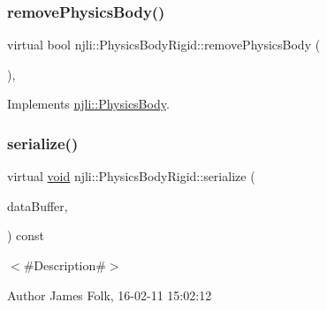 \mbox{\label{classnjli_1_1_physics_body_rigid_a7efbdfc46e8df26d073b00efaaf0c91c}} 
\subsubsection{\texorpdfstring{remove\+Physics\+Body()}{removePhysicsBody()}}
{\footnotesize\ttfamily virtual bool njli\+::\+Physics\+Body\+Rigid\+::remove\+Physics\+Body (\begin{DoxyParamCaption}{ }\end{DoxyParamCaption})\hspace{0.3cm}{\ttfamily [protected]}, {\ttfamily [virtual]}}



Implements \mbox{\hyperlink{classnjli_1_1_physics_body_a832ed4f79a2b52b334d63d094364f86a}{njli\+::\+Physics\+Body}}.

\mbox{\label{classnjli_1_1_physics_body_rigid_aa2f009ffadaf78b84bd36c8cb5536f6c}} 
\subsubsection{\texorpdfstring{serialize()}{serialize()}}
{\footnotesize\ttfamily virtual \mbox{\hyperlink{_thread_8h_af1e856da2e658414cb2456cb6f7ebc66}{void}} njli\+::\+Physics\+Body\+Rigid\+::serialize (\begin{DoxyParamCaption}\item[{\mbox{\hyperlink{_thread_8h_af1e856da2e658414cb2456cb6f7ebc66}{void}} $\ast$}]{data\+Buffer,  }\item[{bt\+Serializer $\ast$}]{ }\end{DoxyParamCaption}) const\hspace{0.3cm}{\ttfamily [virtual]}}



$<$\#\+Description\#$>$ 

\begin{DoxyAuthor}{Author}
James Folk, 16-\/02-\/11 15\+:02\+:12
\end{DoxyAuthor}

